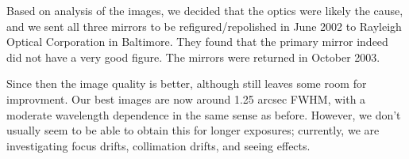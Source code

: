 \documentclass{article}[12pt]
\begin{document}
Based on analysis of the images, we decided that the optics were likely
the cause, and we sent all three mirrors to be refigured/repolished in June 2002
to Rayleigh Optical Corporation in Baltimore. They found that the primary
mirror indeed did not have a very good figure. The mirrors were returned in
October 2003. 

Since then the image quality is better, although still leaves some room
for improvment. Our best images are now around 1.25 arcsec FWHM, with a
moderate wavelength dependence in the same sense as before. However, we don't
usually seem to be able to obtain this for longer exposures; currently,
we are investigating focus drifts, collimation drifts, and seeing effects.


%
%
%
\end{document}
